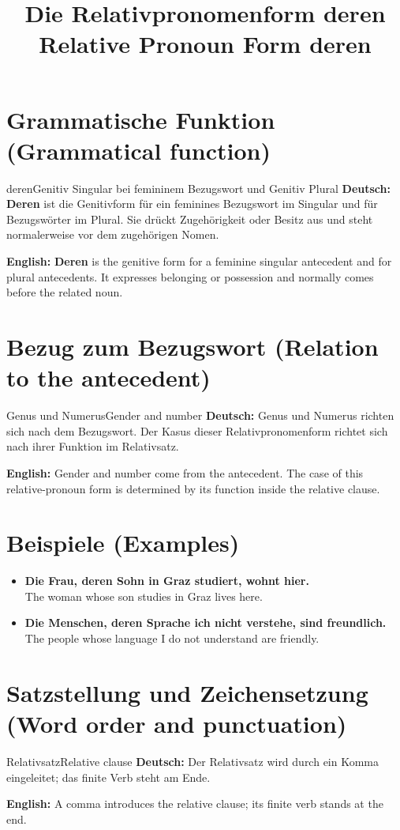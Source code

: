 \documentclass[a4paper,11pt]{article}
\title{Die Relativpronomenform \glqq deren\grqq{}\\\large Relative Pronoun Form \glqq deren\grqq{}}
\date{}
\newcommand{\GermanText}[1]{\textbf{Deutsch: }#1\par}
\newcommand{\EnglishText}[1]{{\small\color{SoftGray}\textbf{English: }#1\par}}
\newcommand{\ExampleItem}[2]{\item \textbf{#1}\\{\small\color{SoftGray}#2}}
\begin{document}
\maketitle
\tableofcontents
\newpage
\section{Grammatische Funktion (Grammatical function)}
\begin{grammarentry}{deren}{Genitiv Singular bei femininem Bezugswort und Genitiv Plural}
\GermanText{\textbf{Deren} ist die Genitivform für ein feminines Bezugswort im Singular und für Bezugswörter im Plural. Sie drückt Zugehörigkeit oder Besitz aus und steht normalerweise vor dem zugehörigen Nomen.}
\EnglishText{\textbf{Deren} is the genitive form for a feminine singular antecedent and for plural antecedents. It expresses belonging or possession and normally comes before the related noun.}
\end{grammarentry}
\section{Bezug zum Bezugswort (Relation to the antecedent)}
\begin{grammarentry}{Genus und Numerus}{Gender and number}
\GermanText{Genus und Numerus richten sich nach dem Bezugswort. Der Kasus dieser Relativpronomenform richtet sich nach ihrer Funktion im Relativsatz.}
\EnglishText{Gender and number come from the antecedent. The case of this relative-pronoun form is determined by its function inside the relative clause.}
\end{grammarentry}
\section{Beispiele (Examples)}
\begin{exbox}\begin{itemize}
\ExampleItem{Die Frau, deren Sohn in Graz studiert, wohnt hier.}{The woman whose son studies in Graz lives here.}
\ExampleItem{Die Menschen, deren Sprache ich nicht verstehe, sind freundlich.}{The people whose language I do not understand are friendly.}
\end{itemize}\end{exbox}
\section{Satzstellung und Zeichensetzung (Word order and punctuation)}
\begin{grammarentry}{Relativsatz}{Relative clause}
\GermanText{Der Relativsatz wird durch ein Komma eingeleitet; das finite Verb steht am Ende.}
\EnglishText{A comma introduces the relative clause; its finite verb stands at the end.}
\end{grammarentry}
\end{document}
